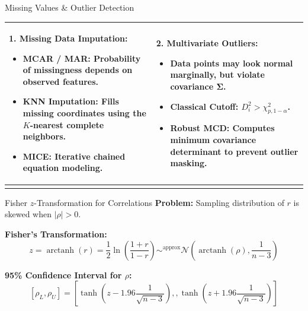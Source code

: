 \documentclass[aspectratio=169,ignorenonframetext]{beamer}
\begin{document}
\begin{frame}{Missing Values \& Outlier Detection}
{\def\LTcaptype{none} %
\begin{longtable}[]{@{}
  >{\raggedright\arraybackslash}p{}
  >{\raggedright\arraybackslash}p{}@{}}
\toprule\noalign{}
\endhead
\begin{minipage}[t]{\linewidth}\raggedright
\textbf{1. Missing Data Imputation:}

\begin{itemize}
\item
  \textbf{MCAR / MAR:} Probability of missingness depends on observed
  features.
\item
  \textbf{KNN Imputation:} Fills missing coordinates using the
  \(K\)-nearest complete neighbors.
\item
  \textbf{MICE:} Iterative chained equation modeling.
\end{itemize}
\end{minipage} & \begin{minipage}[t]{\linewidth}\raggedright
\textbf{2. Multivariate Outliers:}

\begin{itemize}
\item
  Data points may look normal marginally, but violate covariance
  \(\mathbf{\Sigma}\).
\item
  \textbf{Classical Cutoff:} \(D_{i}^{2} > \chi_{p,1 - \alpha}^{2}\).
\item
  \textbf{Robust MCD:} Computes minimum covariance determinant to
  prevent outlier masking.
\end{itemize}
\end{minipage} \\
\bottomrule\noalign{}
\end{longtable}
}
\end{frame}

\begin{frame}{Fisher \(z\)-Transformation for Correlations}
\textbf{Problem:} Sampling distribution of \(r\) is skewed when
\(|\rho| > 0\).

\textbf{Fisher's Transformation:}
\[z = \operatorname{arctanh}(r) = \frac{1}{2}\ln(\frac{1 + r}{1 - r}) \sim^{\text{approx}}\mathcal{N}(\operatorname{arctanh}(\rho),\frac{1}{n - 3})\]

\textbf{95\% Confidence Interval for \(\rho\):}
\[\left\lbrack \rho_{L},\rho_{U} \right\rbrack = \left\lbrack \tanh(z - 1.96\frac{1}{\sqrt{n - 3}}),,\tanh(z + 1.96\frac{1}{\sqrt{n - 3}}) \right\rbrack\]
\end{frame}
\end{document}
